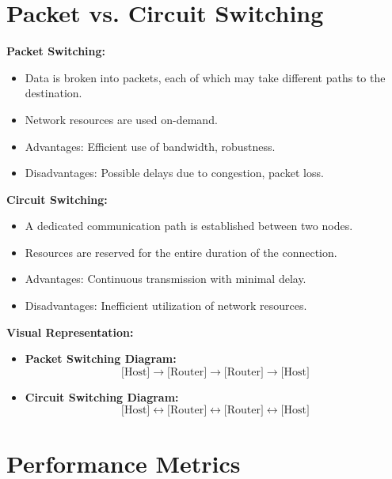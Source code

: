 \documentclass[10pt]{article}
\begin{document}
\section*{Packet vs. Circuit Switching}

\textbf{Packet Switching:}
\begin{itemize}
    \item Data is broken into packets, each of which may take different paths to the destination.
    \item Network resources are used on-demand.
    \item Advantages: Efficient use of bandwidth, robustness.
    \item Disadvantages: Possible delays due to congestion, packet loss.
\end{itemize}

\textbf{Circuit Switching:}
\begin{itemize}
    \item A dedicated communication path is established between two nodes.
    \item Resources are reserved for the entire duration of the connection.
    \item Advantages: Continuous transmission with minimal delay.
    \item Disadvantages: Inefficient utilization of network resources.
\end{itemize}

\textbf{Visual Representation:}
\begin{itemize}
    \item \textbf{Packet Switching Diagram:}
    \[
    \text{[Host]} \rightarrow \text{[Router]} \rightarrow \text{[Router]} \rightarrow \text{[Host]}
    \]
    \item \textbf{Circuit Switching Diagram:}
    \[
    \text{[Host]} \leftrightarrow \text{[Router]} \leftrightarrow \text{[Router]} \leftrightarrow \text{[Host]}
    \]
\end{itemize}

\section*{Performance Metrics}
\end{document}
